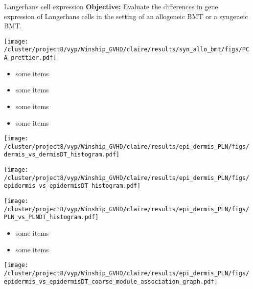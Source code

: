 \documentclass[final,hyperref={pdfpagelabels=false}]{beamer}
\begin{document}
\begin{frame}{}
\begin{columns}[t]
      \begin{column}{.25\linewidth}
        \begin{block}{Langerhans cell expression}
	  {\bf Objective:} Evaluate the differences in gene expression of Langerhans cells in the setting of an allogeneic BMT or a syngeneic BMT.
           \begin{center}
           \texttt{[image: /cluster/project8/vyp/Winship\_GVHD/claire/results/syn\_allo\_bmt/figs/PCA\_prettier.pdf]}
          \end{center}
{\small
          \begin{itemize}
          \item some items
          \item some items
          \item some items
          \item some items
          \end{itemize}}

	  \begin{minipage}{0.45\textwidth}
            \texttt{[image: /cluster/project8/vyp/Winship\_GVHD/claire/results/epi\_dermis\_PLN/figs/dermis\_vs\_dermisDT\_histogram.pdf]}
          \end{minipage}
          \begin{minipage}{0.45\textwidth}
            \texttt{[image: /cluster/project8/vyp/Winship\_GVHD/claire/results/epi\_dermis\_PLN/figs/epidermis\_vs\_epidermisDT\_histogram.pdf]}
          \end{minipage}
          \begin{minipage}{0.45\textwidth}
            \texttt{[image: /cluster/project8/vyp/Winship\_GVHD/claire/results/epi\_dermis\_PLN/figs/PLN\_vs\_PLNDT\_histogram.pdf]}
          \end{minipage}
{\small          \begin{itemize}
            \item some items
            \item some items
           \end{itemize}}
	  \begin{minipage}{0.45\textwidth}
            \texttt{[image: /cluster/project8/vyp/Winship\_GVHD/claire/results/epi\_dermis\_PLN/figs/epidermis\_vs\_epidermisDT\_coarse\_module\_association\_graph.pdf]}
          \end{minipage}


\end{block}
\end{column}
\end{columns}
\end{frame}
\end{document}
